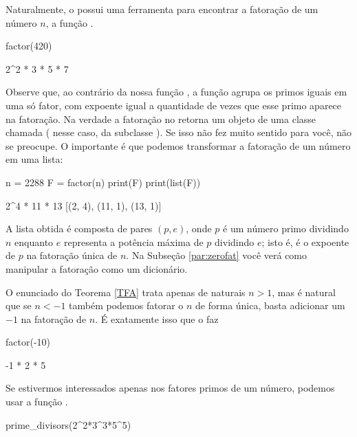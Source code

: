 Naturalmente, o \Sage possui uma ferramenta
para encontrar a fatoração de um número $n$, a
função .

\begin{sageinput}
factor(420)
\end{sageinput}
\begin{sageoutput}
2^2 * 3 * 5 * 7
\end{sageoutput}

Observe que, ao contrário da nossa função , 
a função  agrupa os primos
iguais em uma só fator, com expoente igual a
quantidade de vezes que esse primo aparece na fatoração. Na 
verdade a fatoração no \Sage retorna um objeto 
de uma classe chamada  (
nesse caso, da subclasse ).
Se isso não fez muito sentido para você,
não se preocupe. O importante é que podemos 
transformar a fatoração de um número em uma lista:
\begin{sageinput}
n = 2288
F = factor(n)
print(F)
print(list(F))
\end{sageinput}
\begin{sageoutput}
2^4 * 11 * 13
[(2, 4), (11, 1), (13, 1)]
\end{sageoutput}
A lista obtida é composta de pares $(p,e)$, onde
$p$ é um número primo dividindo $n$ enquanto $e$ 
representa a potência máxima de $p$ dividindo $e$;
isto é, é o expoente de $p$ na fatoração única  de $n$.
Na Subseção \ref{par:zerofat} você verá como
manipular a fatoração como um dicionário.

O enunciado do Teorema \ref{TFA} trata apenas
de naturais $n>1$, mas é natural que se $n<-1$
também podemos fatorar o $n$ de forma única,
basta adicionar um $-1$ na fatoração de
$n$. É exatamente isso que o \Sage faz
\begin{sageinput}
factor(-10)                                                                                        
\end{sageinput}
\begin{sageoutput}
-1 * 2 * 5
\end{sageoutput}

Se estivermos interessados apenas nos fatores
primos de um número, podemos usar
a função .

\begin{sageinput}
prime_divisors(2^2*3^3*5^5)
\end{sageinput}
\begin{sageoutput}
[2,3,5]
\end{sageoutput}


